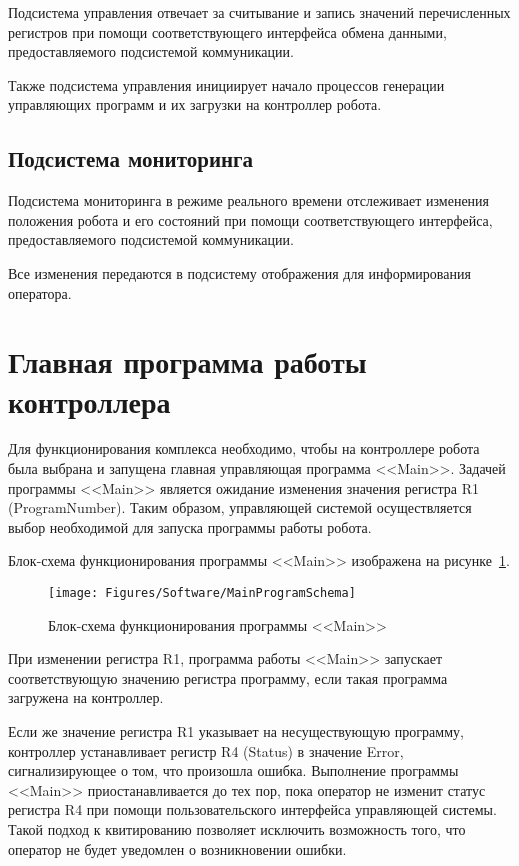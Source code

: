 Подсистема управления отвечает за считывание и запись значений перечисленных регистров при помощи соответствующего интерфейса обмена данными, предоставляемого подсистемой коммуникации.

Также подсистема управления инициирует начало процессов генерации управляющих программ и их загрузки на контроллер робота.

\subsection{Подсистема мониторинга}
Подсистема мониторинга в режиме реального времени отслеживает изменения положения робота и его состояний при помощи соответствующего интерфейса, предоставляемого подсистемой коммуникации.

Все изменения передаются в подсистему отображения для информирования оператора.


\section{Главная программа работы контроллера}
Для функционирования комплекса необходимо, чтобы на контроллере робота была выбрана и запущена главная управляющая программа <<Main>>.
Задачей программы <<Main>> является ожидание изменения значения регистра R1 (ProgramNumber).
Таким образом, управляющей системой осуществляется выбор необходимой для запуска программы работы робота.

Блок-схема функционирования программы <<Main>> изображена на рисунке~\ref{fig:Software:MainProgramSchema}.

\begin{figure}[H]
    \centering
    \vspace{14pt}
    \texttt{[image: Figures/Software/MainProgramSchema]}
    \caption{Блок-схема функционирования программы <<Main>>}
    \label{fig:Software:MainProgramSchema}
\end{figure}

При изменении регистра R1, программа работы <<Main>> запускает соответствующую значению регистра программу, если такая программа загружена на контроллер.

Если же значение регистра R1 указывает на несуществующую программу, контроллер устанавливает регистр R4 (Status) в значение Error, сигнализирующее о том, что произошла ошибка.
Выполнение программы <<Main>> приостанавливается до тех пор, пока оператор не изменит статус регистра R4 при помощи пользовательского интерфейса управляющей системы.
Такой подход к квитированию позволяет исключить возможность того, что оператор не будет уведомлен о возникновении ошибки.

